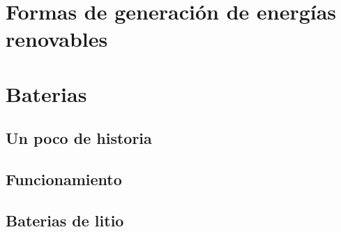 \section{Formas de generación de energías renovables}

\section{Baterias}

\subsection{Un poco de historia}
\subsection{Funcionamiento}
\subsection{Baterias de litio}

